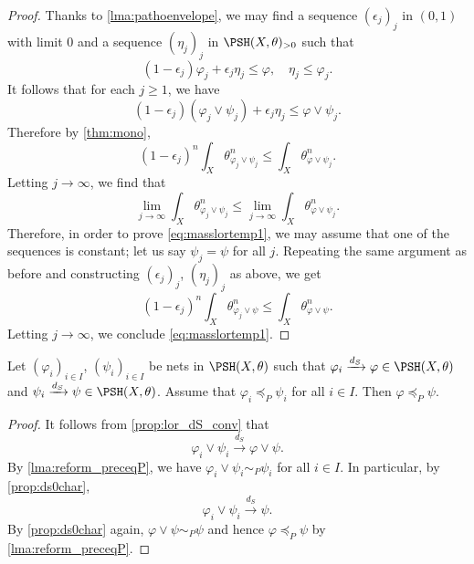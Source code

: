 \begin{proof}
Thanks to \cref{lma:pathoenvelope}, we may find a sequence $(\epsilon_j)_j$ in $(0,1)$ with limit $0$ and a sequence $(\eta_j)_j$ in $\PSH(X,\theta)_{>0}$ such that
\[
    (1-\epsilon_j)\varphi_j+\epsilon_j \eta_j \leq \varphi,\quad \eta_j \leq \varphi_j.
\]
It follows that for each $j\geq 1$, we have
\[
(1-\epsilon_j)(\varphi_j\lor \psi_j)+\epsilon_j \eta_j \leq \varphi \lor \psi_j.
\]
Therefore by \cref{thm:mono},
\[
(1-\epsilon_j)^n \int_X \theta_{\varphi_j\lor \psi_j}^n\leq \int_X \theta_{\varphi \lor \psi_j}^n.
\]
Letting $j\to\infty$, we find that
\[
\lim_{j\to\infty}\int_X \theta_{\varphi_j\lor \psi_j}^n\leq \lim_{j\to\infty}\int_X \theta_{\varphi\lor \psi_j}^n.
\]
Therefore, in order to prove \eqref{eq:masslortemp1}, we may assume that one of the sequences is constant; let us say $\psi_j=\psi$ for all $j$. Repeating the same argument as before and constructing $(\epsilon_j)_j$, $(\eta_j)_j$ as above, we get
\[
(1-\epsilon_j)^n \int_X \theta_{\varphi_j\lor \psi}^n\leq \int_X \theta_{\varphi \lor \psi}^n.
\]
Letting $j\to\infty$, we conclude \eqref{eq:masslortemp1}.
\end{proof}


\begin{proposition}\label{prop:dsconvpresorder}
    Let $(\varphi_i)_{i\in I}$, $(\psi_i)_{i\in I}$ be nets in $\PSH(X,\theta)$ such that $\varphi_i\xrightarrow{d_S} \varphi\in \PSH(X,\theta)$ and $\psi_i\xrightarrow{d_S}\psi\in \PSH(X,\theta)$. Assume that $\varphi_i\preceq_P \psi_i$ for all $i\in I$. Then $\varphi\preceq_P \psi$.
\end{proposition}
\begin{proof}
    It follows from \cref{prop:lor_dS_conv} that
    \[
        \varphi_i\lor\psi_i\xrightarrow{d_S}\varphi\lor \psi.
    \]
    By \cref{lma:reform_preceqP}, we have $\varphi_i\lor\psi_i\sim_P \psi_i$ for all $i\in I$. In particular, by \cref{prop:ds0char},
    \[
        \varphi_i\lor\psi_i\xrightarrow{d_S}\psi.
    \]
    By \cref{prop:ds0char} again, $\varphi\lor\psi\sim_P\psi$ and hence $\varphi\preceq_P \psi$ by \cref{lma:reform_preceqP}.
\end{proof}

